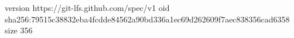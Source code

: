 version https://git-lfs.github.com/spec/v1
oid sha256:79515c38832eba4fcdde84562a90bd336a1ec69d262609f7aec838356cad6358
size 356
